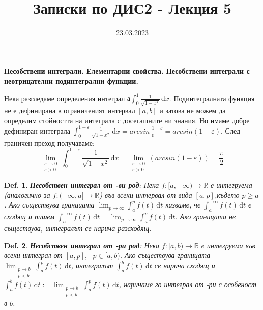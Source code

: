 \documentclass[12pt]{article}
\newcommand{\RNum}[1]{\uppercase\expandafter{\romannumeral #1\relax}}
\newtheorem{definition}{Def.}
\newcommand{\spc}{\text{ }}
\begin{document}
	\color{white}
	\pagecolor{darkgray}
	\title{Записки по ДИС2 - Лекция 5}
	\date{23.03.2023}
	\maketitle
	\begin{center}
		\Large
		\textbf{Несобствени интеграли. Елементарни свойства. Несобствени интеграли с неотрицателни подинтегрални функции.}
	\end{center}
	
	Нека разгледаме определения интеграл $а \int_{0}^{1}\frac{1}{\sqrt{1-x^2}}\,\mathrm{d}x$. Подинтегралната функция не е дефинирана в ограниченият интервал $[a,b]$ и затова не можем да определим стойността на интеграла с досегашните ни знания. Но имаме добре дефиниран интеграла $\int_{0}^{1-\varepsilon}\frac{1}{\sqrt{1-x^2}}\,\mathrm{d}x = arcsin{\big|}_{0}^{1-\varepsilon} = arcsin(1-\varepsilon)$. След граничен преход получаваме:\\
	\[\lim_{\substack{\varepsilon\to 0 \\ \varepsilon>0}}\int_{0}^{1-\varepsilon}\frac{1}{\sqrt{1-x^2}}\,\mathrm{d}x = \lim_{\substack{\varepsilon\to 0 \\ \varepsilon>0}}(arcsin(1-\varepsilon)) = \frac{\pi}{2}\]
	
	\begin{definition} \textbf{\textit{Несобствен интеграл от \RNum{1}-ви род}}:
		Нека $f : [a,+\infty) \rightarrow \mathbb{R}$ е интегруема (аналогично за $f : (-\infty, a] \rightarrow \mathbb{R}$) във всеки интервал от вида $[a,p]$,където $p\geq a$. Ако съществува границата
		$\lim_{p\to\infty}\int_{a}^{p}f(t)\,\mathrm{d}t$ казваме, че $\int_{a}^{+\infty}f(t)\,\mathrm{d}t$ е сходящ и пишем $\int_{a}^{+\infty}f(t)\,\mathrm{d}t = \lim_{p\to\infty}\int_{a}^{p}f(t)\,\mathrm{d}t$. Ако границата не съществува, интегралът се нарича разсходящ.
	\end{definition}

	\begin{definition} \textbf{\textit{Несобствен интеграл от \RNum{2}-ри род}}:
		Нека $f : [a,b) \rightarrow \mathbb{R}$ е интегруема във всеки интеграл от $[a,p],\spc p\in[a,b)$. Ако съществува границата $\lim_{\substack{p\to b \\ p<b}}\int_{a}^{p}f(t)\,\mathrm{d}t$, интегралът $\int_{a}^{b}f(t)\,\mathrm{d}t$ се нарича сходящ и $\int_{a}^{b}f(t)\,\mathrm{d}t := \lim_{\substack{p\to b \\ p<b}}\int_{a}^{p}f(t)\,\mathrm{d}t$, наричаме го интеграл от \RNum{2}-ри с особеност в $b$.
	\end{definition}
	
\end{document}
